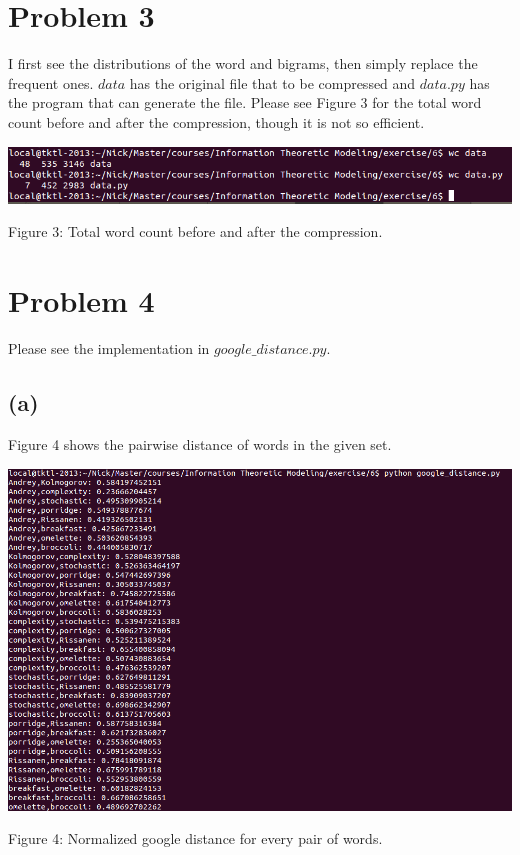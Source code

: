 \documentclass{article}
\begin{document}
\section{Problem 3}

I first see the distributions of the word and bigrams, then simply replace the frequent ones. \emph{$data$} has the original file that to be compressed and \emph{$data.py$} has the program that can generate the file. Please see Figure 3 for the total word count before and after the compression, though it is not so efficient. 

\vspace{5mm}
\begin{minipage}{0.9\textwidth}
  \includegraphics[width=\textwidth,keepaspectratio]{3.png}
  \centerline{Figure 3: Total word count before and after the compression.}
\end{minipage}
\vspace{5mm}

\section{Problem 4}

Please see the implementation in \emph{$google\_distance.py$}.

\subsection*{(a)}

Figure 4 shows the pairwise distance of words in the given set.

\vspace{5mm}
\begin{minipage}{0.9\textwidth}
  \includegraphics[width=\textwidth,keepaspectratio]{4.png}
  \centerline{Figure 4: Normalized google distance for every pair of words.}
\end{minipage}
\vspace{5mm}
\end{document}
